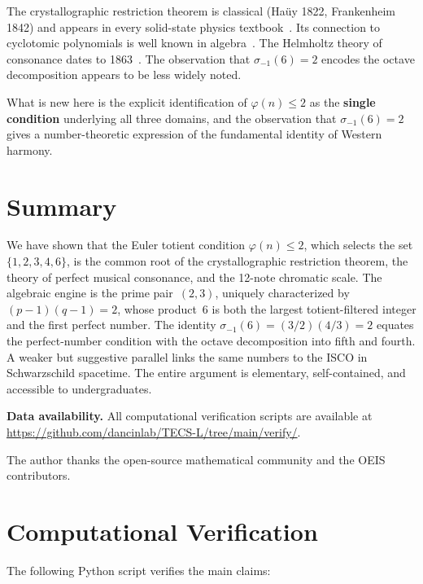 \documentclass[preprint]{revtex4-2}
\begin{document}
The crystallographic restriction theorem is classical (Ha\"uy 1822, Frankenheim 1842) and appears in every solid-state physics textbook~\cite{ashcroft,kittel}. Its connection to cyclotomic polynomials is well known in algebra~\cite{lang}. The Helmholtz theory of consonance dates to 1863~\cite{helmholtz}. The observation that $\sigma_{-1}(6) = 2$ encodes the octave decomposition appears to be less widely noted.

What is new here is the explicit identification of $\varphi(n) \leq 2$ as the \textbf{single condition} underlying all three domains, and the observation that $\sigma_{-1}(6) = 2$ gives a number-theoretic expression of the fundamental identity of Western harmony.

\section{Summary}

We have shown that the Euler totient condition $\varphi(n) \leq 2$, which selects the set $\{1, 2, 3, 4, 6\}$, is the common root of the crystallographic restriction theorem, the theory of perfect musical consonance, and the 12-note chromatic scale. The algebraic engine is the prime pair~$(2,3)$, uniquely characterized by $(p-1)(q-1) = 2$, whose product~6 is both the largest totient-filtered integer and the first perfect number. The identity $\sigma_{-1}(6) = (3/2)(4/3) = 2$ equates the perfect-number condition with the octave decomposition into fifth and fourth. A weaker but suggestive parallel links the same numbers to the ISCO in Schwarzschild spacetime. The entire argument is elementary, self-contained, and accessible to undergraduates.

\bigskip
\noindent\textbf{Data availability.} All computational verification scripts are available at \url{https://github.com/dancinlab/TECS-L/tree/main/verify/}.

\begin{acknowledgments}
The author thanks the open-source mathematical community and the OEIS contributors.
\end{acknowledgments}

\appendix

\section{Computational Verification}\label{app:code}

The following Python script verifies the main claims:
\end{document}
